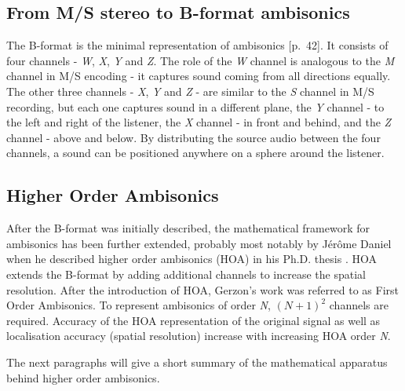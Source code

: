 \subsection{From M/S stereo to B-format ambisonics}

The B-format is the minimal representation of ambisonics \cite{new_realities_in_audio}[p.~42]. It consists of four channels - 
\emph{W}, \emph{X}, \emph{Y} and \emph{Z}.
The role of the \emph{W} channel is analogous to the \emph{M} channel in M/S encoding - 
it captures sound coming from all directions equally. 
The other three channels - \emph{X}, \emph{Y} and \emph{Z} - are similar to the \emph{S} 
channel in M/S recording, but each one captures sound in a different plane,
the \emph{Y} channel - to the left and right of the listener, the \emph{X} channel - in front and behind,
and the \emph{Z} channel - above and below.
By distributing the source audio between the four channels, a sound can be positioned anywhere
on a sphere around the listener.
\cite{new_realities_in_audio}\cite{gerzon1973periphony}\cite{sba_using_hoa}

\subsection{Higher Order Ambisonics}
After the B-format was initially described, the mathematical framework
for ambisonics has been further extended, probably most notably by J{\'e}r{\^o}me 
Daniel when he described higher order ambisonics (HOA) in his Ph.D. thesis \cite{hoa_daniel}.
HOA extends the B-format by adding additional channels to increase the spatial resolution.
After the introduction of HOA, Gerzon's work was referred to as First Order Ambisonics.
To represent ambisonics of order \emph{N}, \emph{\((N+1)^2\)} channels are required.
Accuracy of the HOA representation of the original signal as well as localisation accuracy (spatial resolution) 
increase with increasing HOA order \emph{N}. \cite{ebu_sbo_hoa}\cite{new_realities_in_audio}

The next paragraphs will give a short summary of the mathematical apparatus behind higher order ambisonics.

